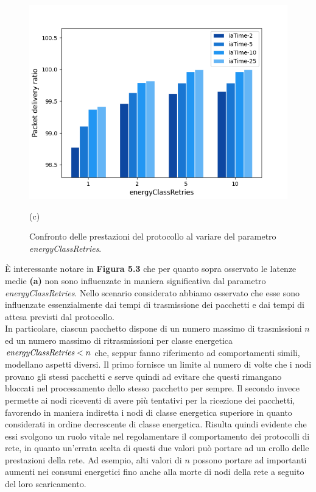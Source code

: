 \documentclass[binding=0.6cm,TFA]{sapthesis}
\begin{document}
\begin{figure}[h]
\begin{minipage}{.5\textwidth}
        \includegraphics[width=1\linewidth]{pdr_retries__comparison_plot.png}
        \caption*{(c)}
    \end{minipage}
    \caption{Confronto delle prestazioni del protocollo al variare del parametro \emph{energyClassRetries}.}
\end{figure}

È interessante notare in \textbf{Figura 5.3} che per quanto sopra osservato le latenze medie \textbf{(a)} non sono influenzate in maniera significativa dal
parametro \emph{energyClassRetries}. Nello scenario considerato abbiamo osservato che esse sono influenzate essenzialmente dai tempi di trasmissione dei
pacchetti e dai tempi di attesa previsti dal protocollo.\\

In particolare, ciascun pacchetto dispone di un numero massimo di trasmissioni $n$ ed un numero massimo di ritrasmissioni per classe energetica
$\emph{energyClassRetries}<n$ che, seppur fanno riferimento ad comportamenti simili, modellano aspetti diversi. Il primo fornisce un limite al
numero di volte che i nodi provano gli stessi pacchetti e serve quindi ad evitare che questi rimangano bloccati nel processamento dello stesso pacchetto
per sempre. Il secondo invece permette ai nodi riceventi di avere più tentativi per la ricezione dei pacchetti, favorendo in maniera indiretta
i nodi di classe energetica superiore in quanto considerati in ordine decrescente di classe energetica. Risulta quindi evidente che essi svolgono
un ruolo vitale nel regolamentare il comportamento dei protocolli di rete, in quanto un'errata scelta di questi due valori può portare ad un crollo
delle prestazioni della rete. Ad esempio, alti valori di $n$ possono portare ad importanti aumenti nei consumi energetici fino anche alla morte di
nodi della rete a seguito del loro scaricamento.\\
\end{document}
